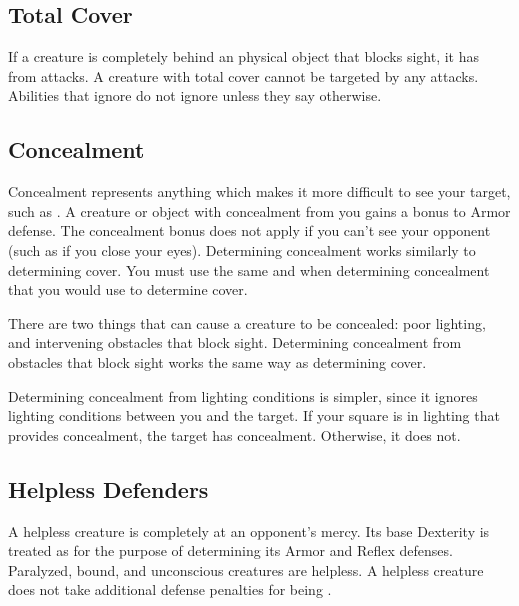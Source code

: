     \subsection{Total Cover}\label{Total Cover}
        If a creature is completely behind an physical object that blocks sight, it has  from attacks.
        A creature with total cover cannot be targeted by any attacks.
        Abilities that ignore  do not ignore  unless they say otherwise.

    \subsection{Concealment}\label{Concealment}
        Concealment represents anything which makes it more difficult to see your target, such as .
        A creature or object with concealment from you gains a  bonus to Armor defense.
        The concealment bonus does not apply if you can't see your opponent (such as if you close your eyes).
        Determining concealment works similarly to determining cover.
        You must use the same  and  when determining concealment that you would use to determine cover.

         There are two things that can cause a creature to be concealed: poor lighting, and intervening obstacles that block sight.
        Determining concealment from obstacles that block sight works the same way as determining cover.

        Determining concealment from lighting conditions is simpler, since it ignores lighting conditions between you and the target.
        If your  square is in lighting that provides concealment, the target has concealment.
        Otherwise, it does not.

    \subsection{Helpless Defenders}
        A helpless creature is completely at an opponent's mercy.
        Its base Dexterity is treated as  for the purpose of determining its Armor and Reflex defenses.
        Paralyzed, bound, and unconscious creatures are helpless.
        A helpless creature does not take additional defense penalties for being \unaware.

